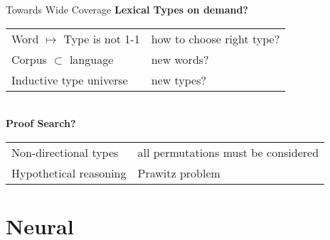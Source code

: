 \documentclass{beamer}
\newcommand{\dg}[1]{\textcolor{darkgreen}{#1}}
\newcommand{\dr}[1]{\textcolor{darkred}{#1}}
\begin{document}
\begin{frame}{Towards Wide Coverage}
	\smaller
	\textbf{Lexical Types on demand?}\\
	\begin{tabularx}{1\textwidth}{@{}l@{$\implies$}l@{}}
	Word $\mapsto$ Type is not 1-1 & how to choose right type?\\
	Corpus $\subset$ language & new words?\\
	Inductive type universe & new types?
	\end{tabularx}\\[15pt]

	\textbf{Proof Search?}\\
	\begin{tabularx}{1\textwidth}{@{}l@{$\implies$}l@{}}
	Non-directional types & all permutations must be considered\\
	Hypothetical reasoning & Prawitz problem
	\end{tabularx}
\end{frame}

\section{Neural}
\newcommand{\vnorm}[1]{%
	\ensuremath{\vphantom{\diamondsuit^X}{#1}}%
}
\newcommand{\qmarkat}[2]{\alt<#1>{#2}{\vnorm{???}}}
\newcommand{\rqmarkat}[3]{\alt<#1>{\qmarkat{#2}{\dr{\vnorm{#3}}}}{}}
\newcommand{\gqmarkat}[3]{\alt<#1>{\qmarkat{#2}{\dg{\vnorm{#3}}}}{}}
\end{document}

